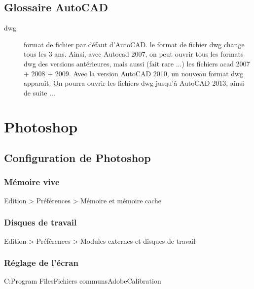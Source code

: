 \documentclass[a4paper,12pt,french]{sphinxmanual}
\begin{document}
\section{Glossaire AutoCAD}
\label{acad/glossaire_acad::doc}\label{acad/glossaire_acad:glossaire-acad}\label{acad/glossaire_acad:glossaire-autocad}\begin{description}
\item[{dwg}] \leavevmode{}\label{acad/glossaire_acad:term-dwg}
format de fichier par défaut d'AutoCAD.
le format de fichier dwg change tous les 3 ans. Ainsi, avec
Autocad 2007, on peut ouvrir tous les formats dwg des versions
antérieures, mais aussi (fait rare ...) les fichiers acad
2007 + 2008 + 2009. Avec la version AutoCAD 2010, un nouveau
format dwg apparaît. On pourra ouvrir les fichiers dwg
jusqu'à AutoCAD 2013, ainsi de suite ...

\end{description}


\chapter{Photoshop}
\label{psd/index:photoshop}\label{psd/index::doc}\label{psd/index:index-ptshp}

\section{Configuration de Photoshop}
\label{psd/config_psd::doc}\label{psd/config_psd:configuration-de-photoshop}

\subsection{Mémoire vive}
\label{psd/config_psd:memoire-vive}
Edition \textgreater{} Préférences \textgreater{} Mémoire et mémoire cache


\subsection{Disques de travail}
\label{psd/config_psd:disques-de-travail}
Edition \textgreater{} Préférences \textgreater{} Modules externes et disques de travail


\subsection{Réglage de l'écran}
\label{psd/config_psd:reglage-de-l-ecran}
C:Program FilesFichiers communsAdobeCalibration
\end{document}
